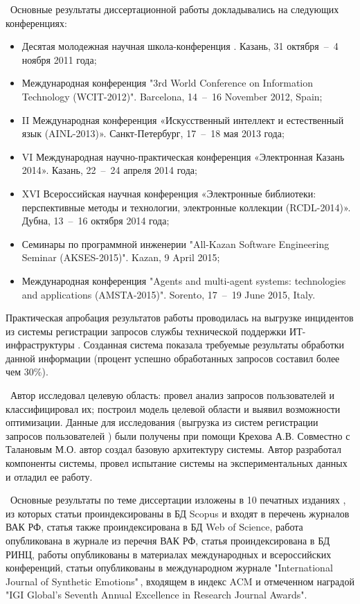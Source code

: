 \probation\
 Основные результаты диссертационной работы докладывались на следующих конференциях:
\begin{itemize}
	\item Десятая молодежная научная школа-конференция . Казань, 31 октября~--~4 ноября 2011 года;
	\item Международная конференция "3rd World Conference on Information Technology (WCIT-2012)". Barcelona, 14~--~16 November 2012, Spain; 
	\item II Международная конференция «Искусственный интеллект и естественный язык (AINL-2013)». Санкт-Петербург, 17~--~18 мая 2013 года;
	\item VI Международная научно-практическая конференция «Электронная Казань 2014». Казань, 22~--~24 апреля 2014 года;
	\item XVI Всероссийская научная конференция «Электронные библиотеки: перспективные методы и технологии, электронные коллекции (RCDL-2014)». Дубна, 13~--~16 октября 2014 года;
	\item Семинары по программной инженерии "All-Kazan Software Engineering Seminar (AKSES-2015)". Kazan, 9 April 2015;
	\item Международная конференция "Agents and multi-agent systems: technologies and applications (AMSTA-2015)". Sorento, 17~--~19 June 2015, Italy.
\end{itemize} \par
Практическая апробация результатов работы проводилась на выгрузке инцидентов из системы регистрации запросов службы технической поддержки ИТ-инфраструктуры \icl. Созданная система показала требуемые результаты обработки данной информации (процент успешно обработанных запросов составил более чем 30\%). \par
\contribution\ Автор исследовал целевую область: провел анализ запросов пользователей и классифицировал их; построил модель целевой области и выявил возможности оптимизации. Данные для исследования (выгрузка из систем регистрации запросов пользователей \iclshort) были получены при помощи Крехова А.В.  Совместно с Талановым М.О. автор создал базовую архитектуру системы. Автор разработал компоненты системы, провел испытание системы на экспериментальных данных и отладил ее работу. \par
\publications\ Основные результаты по теме диссертации изложены в 10 печатных изданиях  \cite{Lobachevskii, WCIT-2012,  ISGZ, IJSE-1, IJSE-2, RCDL-2014, AMSTA-2015, VAK-1, EB-1, EB-2}, из которых статьи \cite{RCDL-2014, AMSTA-2015} проиндексированы в БД Scopus и входят в перечень журналов ВАК РФ, статья \cite{AMSTA-2015} также проиндексирована в БД Web of Science, работа \cite{VAK-1} опубликована в журнале из перечня ВАК РФ, статья \cite{ISGZ} проиндексирована в БД РИНЦ, работы \cite{Lobachevskii, WCIT-2012, ISGZ} опубликованы в материалах международных и всероссийских конференций, статьи \cite{IJSE-1, IJSE-2} опубликованы в международном журнале "International Journal of Synthetic Emotions"\,, входящем в индекс ACM и отмеченном наградой "IGI Global’s Seventh Annual Excellence in Research Journal Awards".



